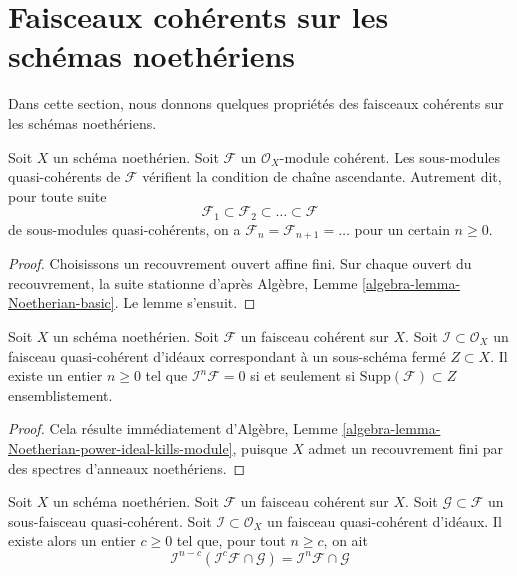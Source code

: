 \section{Faisceaux cohérents sur les schémas noethériens}
\label{section-coherent-quasi-compact}

\noindent
Dans cette section, nous donnons quelques propriétés des faisceaux cohérents sur
les schémas noethériens.

\begin{lemma}
\label{lemma-acc-coherent}
Soit $X$ un schéma noethérien.
Soit $\mathcal{F}$ un $\mathcal{O}_X$-module cohérent.
Les sous-modules quasi-cohérents de $\mathcal{F}$ vérifient la condition de chaîne
ascendante. Autrement dit, pour toute suite
$$
\mathcal{F}_1 \subset \mathcal{F}_2 \subset \ldots \subset \mathcal{F}
$$
de sous-modules quasi-cohérents, on a
$\mathcal{F}_n = \mathcal{F}_{n + 1} = \ldots $ pour un certain $n \geq 0$.
\end{lemma}

\begin{proof}
Choisissons un recouvrement ouvert affine fini.
Sur chaque ouvert du recouvrement, la suite stationne d'après
Algèbre, Lemme \ref{algebra-lemma-Noetherian-basic}.
Le lemme s'ensuit.
\end{proof}

\begin{lemma}
\label{lemma-power-ideal-kills-sheaf}
Soit $X$ un schéma noethérien.
Soit $\mathcal{F}$ un faisceau cohérent sur $X$.
Soit $\mathcal{I} \subset \mathcal{O}_X$ un faisceau quasi-cohérent
d'idéaux correspondant à un sous-schéma fermé $Z \subset X$.
Il existe un entier $n \geq 0$ tel que $\mathcal{I}^n\mathcal{F} = 0$
si et seulement si $\text{Supp}(\mathcal{F}) \subset Z$ ensemblistement.
\end{lemma}

\begin{proof}
Cela résulte immédiatement d'Algèbre,
Lemme \ref{algebra-lemma-Noetherian-power-ideal-kills-module},
puisque $X$ admet un recouvrement fini par des spectres d'anneaux noethériens.
\end{proof}

\begin{lemma}
\label{lemma-Artin-Rees}
Soit $X$ un schéma noethérien.
Soit $\mathcal{F}$ un faisceau cohérent sur $X$.
Soit $\mathcal{G} \subset \mathcal{F}$ un sous-faisceau quasi-cohérent.
Soit $\mathcal{I} \subset \mathcal{O}_X$ un faisceau quasi-cohérent
d'idéaux.
Il existe alors un entier $c \geq 0$ tel que, pour tout $n \geq c$,
on ait
$$
\mathcal{I}^{n - c}(\mathcal{I}^c\mathcal{F} \cap \mathcal{G})
=
\mathcal{I}^n\mathcal{F} \cap \mathcal{G}
$$
\end{lemma}

